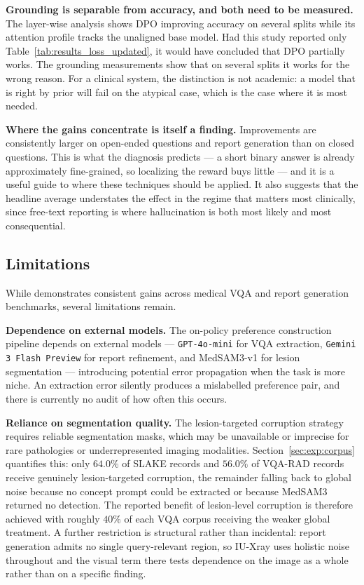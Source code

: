 \textbf{Grounding is separable from accuracy, and both need to be measured.} The layer-wise analysis shows DPO improving accuracy on several splits while its attention profile tracks the unaligned base model. Had this study reported only Table~\ref{tab:results_loss_updated}, it would have concluded that DPO partially works. The grounding measurements show that on several splits it works for the wrong reason. For a clinical system, the distinction is not academic: a model that is right by prior will fail on the atypical case, which is the case where it is most needed.

\textbf{Where the gains concentrate is itself a finding.} Improvements are consistently larger on open-ended questions and report generation than on closed questions. This is what the diagnosis predicts --- a short binary answer is already approximately fine-grained, so localizing the reward buys little --- and it is a useful guide to where these techniques should be applied. It also suggests that the headline average understates the effect in the regime that matters most clinically, since free-text reporting is where hallucination is both most likely and most consequential.

\subsection{Limitations}
\label{sec:con:limitations}

While \ourloss{} demonstrates consistent gains across medical VQA and report generation benchmarks, several limitations remain.

\textbf{Dependence on external models.} The on-policy preference construction pipeline depends on external models --- \texttt{GPT-4o-mini} for VQA extraction, \texttt{Gemini 3 Flash Preview} for report refinement, and MedSAM3-v1 for lesion segmentation --- introducing potential error propagation when the task is more niche. An extraction error silently produces a mislabelled preference pair, and there is currently no audit of how often this occurs.

\textbf{Reliance on segmentation quality.} The lesion-targeted corruption strategy requires reliable segmentation masks, which may be unavailable or imprecise for rare pathologies or underrepresented imaging modalities. Section~\ref{sec:exp:corpus} quantifies this: only $64.0\%$ of SLAKE records and $56.0\%$ of VQA-RAD records receive genuinely lesion-targeted corruption, the remainder falling back to global noise because no concept prompt could be extracted or because MedSAM3 returned no detection. The reported benefit of lesion-level corruption is therefore achieved with roughly $40\%$ of each VQA corpus receiving the weaker global treatment. A further restriction is structural rather than incidental: report generation admits no single query-relevant region, so IU-Xray uses holistic noise throughout and the visual term there tests dependence on the image as a whole rather than on a specific finding.

